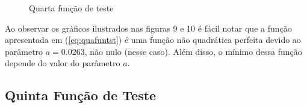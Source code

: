 \begin{figure}[h!]
    \centering 
    \qquad
    \qquad
    \caption{Quarta função de teste}%
    \label{fig:terfun}%
\end{figure}
\FloatBarrier

Ao observar os gráficos ilustrados nas figuras 9 e 10 é fácil notar que a função apresentada em (\ref{eq:quafuntst}) é uma função não quadrática perfeita devido ao parâmetro $a = 0.0263$, não nulo (nesse caso). Além disso, o mínimo dessa função depende do valor do parâmetro $a$.

\subsection{Quinta Função de Teste}\label{sec:quifun}

